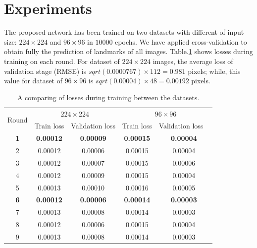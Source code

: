 \documentclass[12pt,a4paper]{article}
\begin{document}
\section{Experiments}
The proposed network has been trained on two datasets with different of input size: $224 \times 224$ and $96 \times 96$ in $10000$ epochs. We have applied cross-validation to obtain fully the prediction of landmarks of all images. Table.\ref{tab2} shows losses during training on each round.
For dataset of $224 \times 224$ images, the average loss of validation stage (RMSE) is \textit{$sqrt(0.0000767) \times 112 = 0.981$} pixels; while, this value for dataset of $96 \times 96$ is \textit{$sqrt(0.00004) \times 48 = 0.00192$} pixels.

\begin{table}[htbp]
\centering
\begin{tabular}{ | c | c | c | c | c | }
\hline
	\multicolumn{1}{|c|}{\multirow{2}{*}{Round}} & \multicolumn{2}{c|}{$224 \times 224$} &  \multicolumn{2}{c|}{$96 \times 96$}  \\ \cline{2-5}
	 & Train loss & Validation loss & Train loss & Validation loss \  \\ \hline
	\textbf{1} & \textbf{0.00012} & \textbf{0.00009} & \textbf{0.00015} & \textbf{0.00004} \\ \hline
	2 & 0.00012 & 0.00006 & 0.00015 & 0.00004 \\ \hline
	3 & 0.00012 & 0.00007 & 0.00015 & 0.00006 \\ \hline
	4 & 0.00012 & 0.00009 & 0.00015 & 0.00004 \\ \hline
	5 & 0.00013 & 0.00010 & 0.00016 & 0.00005 \\ \hline
	\textbf{6} & \textbf{0.00012} & \textbf{0.00006} & \textbf{0.00014} & \textbf{0.00003} \\ \hline
	7 & 0.00013 & 0.00008 & 0.00014 & 0.00003 \\ \hline
	8 & 0.00012 & 0.00006 & 0.00015 & 0.00004 \\ \hline
	9 & 0.00013 & 0.00008 & 0.00014 & 0.00003 \\ \hline
\end{tabular}
\caption{\small{A comparing of losses during training between the datasets.}}
\label{tab2}
\end{table}
\end{document}
